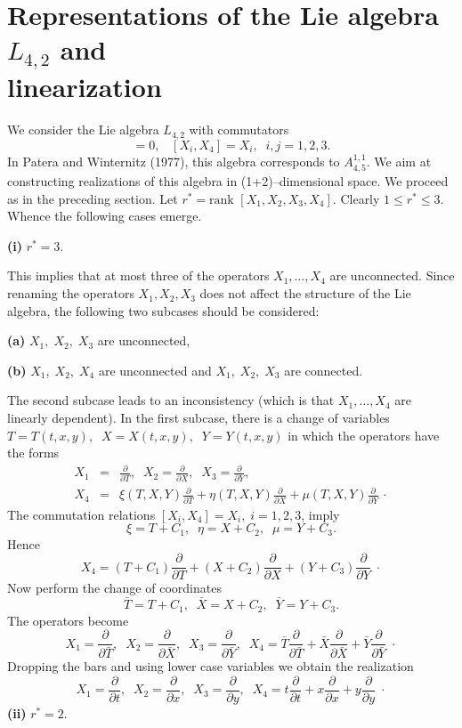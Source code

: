 \section{Representations of the Lie algebra $L_{4,2}$ 
and \\
linearization}
We consider the Lie algebra  $L_{4,2}$ with commutators
\begin{equation}
[X_i,X_j]=0,\;\;\;[X_i,X_4]=X_i,\;\;i,j=1,2,3. \label{ch6:eq10}
\end{equation}
In Patera and Winternitz (1977), this algebra 
corresponds to $A_{4,5}^{1,1}$.
We aim at constructing realizations of this algebra in (1+2)--dimensional
space. We proceed as in the preceding section. Let
$r^{*}=\mbox{rank }[X_1,X_2,X_3,X_4]$. Clearly $1\le r^{*}\le 3$. Whence
the following cases emerge.

{\bf (i)} $r^{*}=3.$

This implies that at most three of the operators $X_1,\ldots,X_4$ are
unconnected. Since renaming the operators $X_1,X_2,X_3$ does not affect
the structure of the Lie algebra, the following two subcases should be
considered:

{\bf (a)} $X_1,\;X_2,\;X_3$ are unconnected,

{\bf (b)} $X_1,\;X_2,\;X_4$ are unconnected and $X_1,\;X_2,\;X_3$ are
connected.

The second subcase leads to an inconsistency (which is that $X_1,\ldots ,X_4$
are linearly dependent). In the first subcase, there is a change of variables
$T=T(t,x,y),\;\;X=X(t,x,y),\;\;Y=Y(t,x,y)$ in which the operators have
the forms
\begin{eqnarray*}
X_1 & = &\frac{\partial}{\partial T},\;\;X_2=\frac{\partial}{\partial X},\;\; 
X_3=\frac{\partial}{\partial Y},\\
X_4 & = & \xi (T,X,Y)\frac{\partial}{\partial T}+\eta (T,X,Y)\frac{\partial}
{\partial X}+\mu (T,X,Y)\frac{\partial}{\partial Y}\,\cdot
\end{eqnarray*}
The commutation relations $[X_i,X_4]=X_i,\;i=1,2,3$, imply
\[\xi=T+C_1,\;\;\eta=X+C_2,\;\;\mu=Y+C_3.\]
Hence
\[X_4=(T+C_1)\frac{\partial}{\partial T}+ (X+C_2)\frac{\partial}{\partial X}
+(Y+C_3)\frac{\partial}{\partial Y}\;\cdot\]
Now perform the change of coordinates
\[\bar T=T+C_1,\;\;\bar X=X+C_2,\;\;\bar Y=Y+C_3.\]
The operators become
\[
X_1 =\frac{\partial}{\partial \bar T},\;\;X_2=\frac{\partial}{\partial \bar X},\;\; 
X_3=\frac{\partial}{\partial \bar Y},\;\;
X_4 = \bar T \frac{\partial}{\partial \bar T}+\bar X \frac{\partial}
{\partial \bar X}+\bar Y\frac{\partial}{\partial \bar Y}\;\cdot
\]
Dropping the bars and using lower case variables we obtain the realization
\begin{equation}
\label{ch6:eq11'}
X_1 = \frac{\partial}{\partial t},\;\;X_2=\frac{\partial}{\partial x},\;\; 
X_3=\frac{\partial}{\partial y},\;\;
X_4 = t\frac{\partial}{\partial t}+ x\frac{\partial}
{\partial x}+y\frac{\partial}{\partial y}\;\cdot
\end{equation}
{\bf (ii)} $r^{*}=2.$

